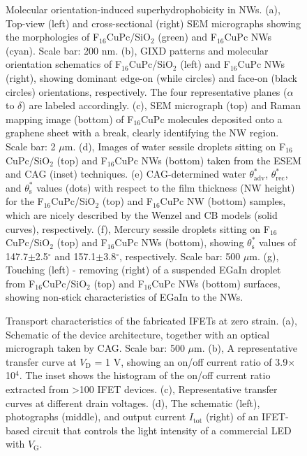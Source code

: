 \begin{figure}[htbp]
\centering
\caption{\label{fig:small-main-2}
Molecular orientation-induced superhydrophobicity in NWs. (a), Top-view (left) and cross-sectional (right) SEM micrographs showing the morphologies of F\(_{\text{16}}\)CuPc/SiO\(_{\text{2}}\) (green) and F\(_{\text{16}}\)CuPc NWs (cyan). Scale bar: 200 nm. (b), GIXD patterns and molecular orientation schematics of F\(_{\text{16}}\)CuPc/SiO\(_{\text{2}}\) (left) and F\(_{\text{16}}\)CuPc NWs (right), showing dominant edge-on (while circles) and face-on (black circles) orientations, respectively. The four representative planes (\(\alpha\) to \(\delta\)) are labeled accordingly. (c), SEM micrograph (top) and Raman mapping image (bottom) of F\(_{\text{16}}\)CuPc molecules deposited onto a graphene sheet with a break, clearly identifying the NW region. Scale bar: 2 \(\mu\)m. (d), Images of water sessile droplets sitting on F\(_{\text{16}}\)CuPc/SiO\(_{\text{2}}\) (top) and F\(_{\text{16}}\)CuPc NWs (bottom) taken from the ESEM and CAG (inset) techniques. (e) CAG-determined water \(\theta_{\mathrm{adv}}^{*}\), \(\theta_{\mathrm{rec}}^{*}\), and \(\theta_{\mathrm{s}}^{*}\) values (dots) with respect to the film thickness (NW height) for the F\(_{\text{16}}\)CuPc/SiO\(_{\text{2}}\) (top) and F\(_{\text{16}}\)CuPc NW (bottom) samples, which are nicely described by the Wenzel and CB models (solid curves), respectively. (f), Mercury sessile droplets sitting on F\(_{\text{16}}\)CuPc/SiO\(_{\text{2}}\) (top) and F\(_{\text{16}}\)CuPc NWs (bottom), showing \(\theta_{\mathrm{s}}^{*}\) values of 147.7\(\pm\)2.5\(^{\circ}\)  and 157.1\(\pm\)3.8\(^{\circ}\), respectively. Scale bar: 500 \(\mu\)m. (g), Touching (left) - removing (right) of a suspended EGaIn droplet from F\(_{\text{16}}\)CuPc/SiO\(_{\text{2}}\) (top) and F\(_{\text{16}}\)CuPc NWs (bottom) surfaces, showing non-stick characteristics of EGaIn to the NWs.}
\end{figure}


\begin{figure}[htbp]
\centering
\caption{\label{fig:small-main-3}
Transport characteristics of the fabricated IFETs at zero strain. (a), Schematic of the device architecture, together with an optical micrograph taken by CAG. Scale bar: 500 \(\mu\)m. (b), A representative transfer curve at \(V_{\mathrm{D}}\) = 1 V, showing an on/off current ratio of 3.9\(\times{}\)10\(^{\text{4}}\). The inset shows the histogram of the on/off current ratio extracted from \textgreater{}100 IFET devices. (c), Representative transfer curves at different drain voltages. (d), The schematic (left), photographs (middle), and output current \(I_{\mathrm{tot}}\) (right) of an IFET-based circuit that controls the light intensity of a commercial LED with \(V_{\mathrm{G}}\).}
\end{figure}


